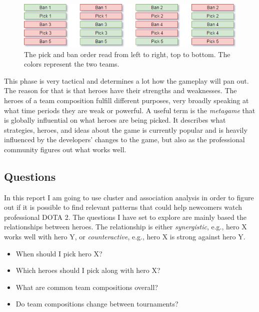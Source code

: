 \documentclass[report.tex]{subfiles}
\begin{document}
\begin{figure}[H]
  \centering
  \includegraphics[width=\textwidth]{./images/dota2}
  \caption{The pick and ban order read from left to right, top to bottom. The colors represent the two teams.}
   \label{fig:picks_bans}
\end{figure}

This phase is very tactical and determines a lot how the gameplay will pan out. The reason for that is that heroes have their strengths and weaknesses. The heroes of a team composition fulfill different purposes, very broadly speaking at what time periods they are weak or powerful. A useful term is the \textit{metagame} that is globally influential on what heroes are being picked. It describes what strategies, heroes, and ideas about the game is currently popular and is heavily influenced by the developers' changes to the game, but also as the professional community figures out what works well.

\subsection*{Questions}

In this report I am going to use cluster and association analysis in order to figure out if it is possible to find relevant patterns that could help newcomers watch professional DOTA 2. The questions I have set to explore are mainly based the relationships between heroes. The relationship is either \textit{synergistic}, e.g., hero X works well with hero Y, or \textit{counteractive}, e.g., hero X is strong against hero Y.

\begin{itemize}
\item When should I pick hero X?
\item Which heroes should I pick along with hero X?
\item What are common team compositions overall?
\item Do team compositions change between tournaments?
\end{itemize}
\end{document}
